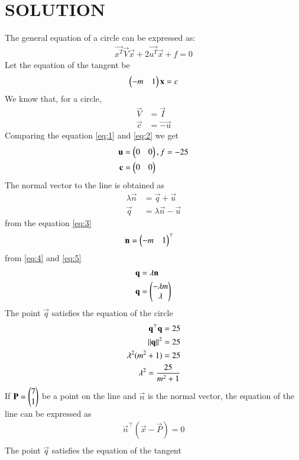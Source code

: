 \documentclass[journal,12pt,twocolumn]{IEEEtran}
\begin{document}
\section{SOLUTION}
The general equation of a circle can be expressed as:
\begin{align}
\vec{x^T}\vec{V}\vec{x} + 2\vec{u^T}\vec{x} + f = 0 \label{eq:2}
\end{align}
Let the equation of the tangent be 
\begin{align}
\begin{pmatrix}-m & 1\end{pmatrix}\mathbf{x}=c \label{eq:3}
\end{align}
We know that, for a circle,
\begin{align}
\vec{V} &= \vec{I}\\
\vec{c} &=\vec{-u}
\end{align} 
Comparing the equation \eqref{eq:1} and \eqref{eq:2} we get
\begin{align}
\mathbf{u} &= \begin{pmatrix}0 & 0\end{pmatrix} , f= -25 \label{eq:4}\\
\mathbf{c} &=\begin{pmatrix}0 & 0\end{pmatrix}
\end{align} 
The normal vector to the line is obtained as
\begin{align}
\lambda\vec{n} &= \vec{q} +\vec{u}\\
\vec{q} &=\lambda\vec{n} - \vec{u}
\end{align}
from the equation \eqref{eq:3}
\begin{align}
\mathbf{n} &= \begin{pmatrix}-m & 1\end{pmatrix}^{\top} \label{eq:5}
\end{align} 
from \eqref{eq:4} and \eqref{eq:5}
\begin{align}
\mathbf{q} &=\lambda\mathbf{n}\\
\mathbf{q} &=\begin{pmatrix}-\lambda m \\ \lambda\end{pmatrix}
\end{align}
The point $\vec{q}$ satisfies the equation of the
circle
\begin{align}
\mathbf{q}^{\top}\mathbf{q} = 25\\
\lVert\mathbf{q}\rVert^{2} = 25\\
\lambda^{2}(m^{2} + 1) = 25\\
\lambda^{2} = \dfrac{25}{m^{2} + 1} \label{eq:6}
\end{align}
If $\mathbf{P} = \begin{pmatrix}7 \\ 1\end{pmatrix} $ be a point on the line and $\vec{n}$ is
the normal vector, the equation of the line can
be expressed as
\begin{align}
\vec{n}^{\top}(\vec{x} -\vec{P} ) = 0\\
\end{align}
The point $\vec{q}$ satisfies the equation of the tangent
\end{document}
